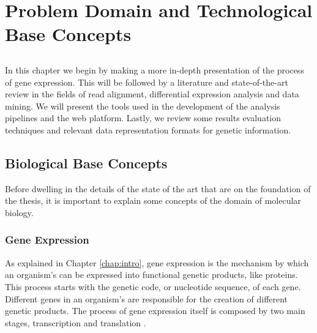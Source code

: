 \chapter{Problem Domain and Technological Base Concepts} \label{chap:sota}

\section*{}


In this chapter we begin by making a more in-depth presentation of the process
of gene expression. This will be followed by a literature and state-of-the-art
review in the fields of read alignment, differential expression analysis and
data mining. We will present the tools used in the development of the analysis
pipelines and the web platform. Lastly, we review some results evaluation
techniques and relevant data representation formats for genetic information.

\section{Biological Base Concepts}


Before dwelling in the details of the state of the art that are on the
foundation of the thesis, it is important to explain some concepts of the
domain of molecular biology.

\subsection{Gene Expression}

As explained in Chapter \ref{chap:intro}, gene expression is the mechanism by
which an organism's \dna{} can be expressed into functional genetic products,
like proteins. This process starts with the genetic code, or nucleotide
sequence, of each gene. Different genes in an organism's \dna{} are responsible
for the creation of different genetic products. The process of gene expression
itself is composed by two main stages, transcription and translation
\cite{leic:gene_expr}.

